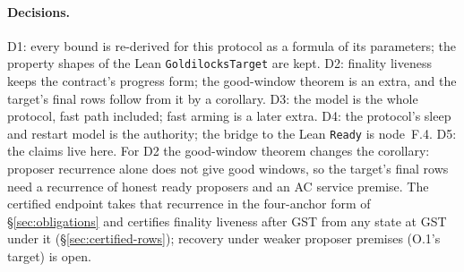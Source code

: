 \documentclass{article}
\begin{document}
\paragraph{Decisions.}  D1: every bound is re-derived for
this protocol as a formula of its parameters; the property shapes of
the Lean \texttt{GoldilocksTarget} are kept.  D2: finality liveness
keeps the contract's progress form; the good-window theorem
is an extra, and the target's final rows follow from it by a corollary.  D3:
the model is the whole protocol, fast path included; fast arming is a later
extra.  D4: the protocol's sleep and restart model is the authority; the
bridge to the Lean \texttt{Ready} is node~F.4.  D5: the claims
live here.  For D2 the good-window theorem changes the corollary: proposer recurrence
alone does not give good windows, so the target's
final rows need a recurrence of honest ready proposers and an AC
service premise.  The certified endpoint takes that recurrence in the
four-anchor form of \S\ref{sec:obligations} and certifies finality
liveness after GST from any state at GST under it
(\S\ref{sec:certified-rows}); recovery under weaker proposer premises
(O.1's target) is open.
\end{document}
